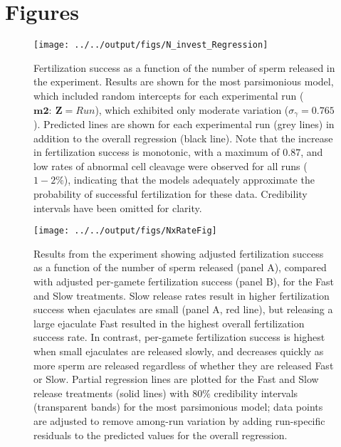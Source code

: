 \documentclass{article}
\begin{document}
\section{Figures}
 
\begin{figure}[!ht]
\centering
\texttt{[image: ../../output/figs/N\_invest\_Regression]}
\caption{Fertilization success as a function of the number of sperm released in the  experiment. Results are shown for the most parsimonious model, which included random intercepts for each experimental run ($\mathbf{m2}:~\mathbf{Z} = Run$), which exhibited only moderate variation ($\sigma_{\gamma} = 0.765$). Predicted lines are shown for each experimental run (grey lines) in addition to the overall regression (black line). Note that the increase in fertilization success is monotonic, with a maximum of $0.87$, and low rates of abnormal cell cleavage were observed for all runs ($1-2\%$), indicating that the models adequately approximate the probability of successful fertilization for these data. Credibility intervals have been omitted for clarity.}
\label{fig:fertPlots}
\end{figure}
\newpage{}


\begin{figure}[!ht] 
\centering
\texttt{[image: ../../output/figs/NxRateFig]}
\caption{Results from the  experiment showing adjusted fertilization success as a function of the number of sperm released (panel A), compared with adjusted per-gamete fertilization success (panel B), for the Fast and Slow treatments. Slow release rates result in higher fertilization success when ejaculates are small (panel A, red line), but releasing a large ejaculate Fast resulted in the highest overall fertilization success rate. In contrast, per-gamete fertilization success is highest when small ejaculates are released slowly, and decreases quickly as more sperm are released regardless of whether they are released Fast or Slow. Partial regression lines are plotted for the Fast and Slow release treatments (solid lines) with $80\%$ credibility intervals (transparent bands) for the most parsimonious model; data points are adjusted to remove among-run variation by adding run-specific residuals to the predicted values for the overall regression.}
\label{fig:perGamete}
\end{figure}

\FloatBarrier
\end{document}
